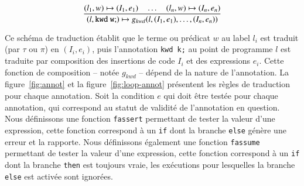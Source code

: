 \vspace{-4mm}
\[
\dfrac
    {(l_1, w) \mapsto (I_1, e_1) \quad \ldots \quad
      (l_n, w) \mapsto (I_n, e_n)}
    {(l, \mathtt{kwd\ w;}) \mapsto
      g_{kwd} (l, (I_1, e_1), \ldots, (I_n, e_n))}
\]
\vspace{-4mm}


Ce schéma de traduction établit que le terme ou prédicat $w$ au label $l_i$ est
traduit (par $\tau$ ou $\pi$) en $(I_i, e_i)$, puis l'annotation
\lstinline'kwd k;' au point de programme $l$ est traduite par composition
des insertions de code $I_i$ et des expressions $e_i$.
Cette fonction de composition -- notée $g_{kwd}$ -- dépend de la nature de
l'annotation.
La figure~\ref{fig:annot} et la figure~\ref{fig:loop-annot} présentent les
règles de traduction pour chaque annotation.
Soit la condition $e$ qui doit être testée pour chaque annotation, qui
correspond au statut de validité de l'annotation en question.
Nous définissons une fonction \lstinline'fassert' permettant de tester la valeur
d'une expression, cette fonction correspond à un \lstinline'if' dont la branche
\lstinline'else' génère une erreur et la rapporte.
Nous définissons également une fonction \lstinline'fassume' permettant de tester
la valeur d'une expression, cette fonction correspond à un \lstinline'if' dont
la branche \lstinline'then' est toujours vraie, les exécutions pour lesquelles
la branche \lstinline'else' est activée sont ignorées.

